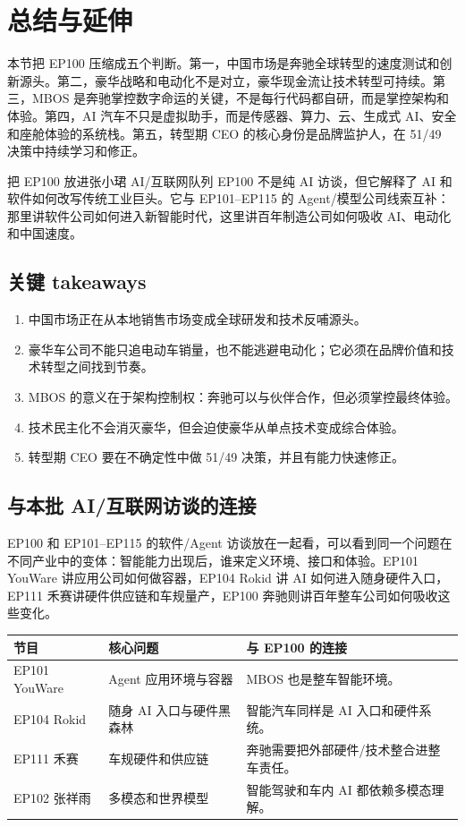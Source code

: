 \section{总结与延伸}

本节把 EP100 压缩成五个判断。第一，中国市场是奔驰全球转型的速度测试和创新源头。第二，豪华战略和电动化不是对立，豪华现金流让技术转型可持续。第三，MBOS 是奔驰掌控数字命运的关键，不是每行代码都自研，而是掌控架构和体验。第四，AI 汽车不只是虚拟助手，而是传感器、算力、云、生成式 AI、安全和座舱体验的系统栈。第五，转型期 CEO 的核心身份是品牌监护人，在 51/49 决策中持续学习和修正。

\begin{importantbox}{把 EP100 放进张小珺 AI/互联网队列}
EP100 不是纯 AI 访谈，但它解释了 AI 和软件如何改写传统工业巨头。它与 EP101--EP115 的 Agent/模型公司线索互补：那里讲软件公司如何进入新智能时代，这里讲百年制造公司如何吸收 AI、电动化和中国速度。
\end{importantbox}

\subsection{关键 takeaways}

\begin{enumerate}
\item 中国市场正在从本地销售市场变成全球研发和技术反哺源头。
\item 豪华车公司不能只追电动车销量，也不能逃避电动化；它必须在品牌价值和技术转型之间找到节奏。
\item MBOS 的意义在于架构控制权：奔驰可以与伙伴合作，但必须掌控最终体验。
\item 技术民主化不会消灭豪华，但会迫使豪华从单点技术变成综合体验。
\item 转型期 CEO 要在不确定性中做 51/49 决策，并且有能力快速修正。
\end{enumerate}

\subsection{与本批 AI/互联网访谈的连接}

EP100 和 EP101--EP115 的软件/Agent 访谈放在一起看，可以看到同一个问题在不同产业中的变体：智能能力出现后，谁来定义环境、接口和体验。EP101 YouWare 讲应用公司如何做容器，EP104 Rokid 讲 AI 如何进入随身硬件入口，EP111 禾赛讲硬件供应链和车规量产，EP100 奔驰则讲百年整车公司如何吸收这些变化。

\noindent\begin{tabularx}{\textwidth}{p{}p{}X}
\toprule
节目 & 核心问题 & 与 EP100 的连接 \\
\midrule
EP101 YouWare & Agent 应用环境与容器 & MBOS 也是整车智能环境。 \\
EP104 Rokid & 随身 AI 入口与硬件黑森林 & 智能汽车同样是 AI 入口和硬件系统。 \\
EP111 禾赛 & 车规硬件和供应链 & 奔驰需要把外部硬件/技术整合进整车责任。 \\
EP102 张祥雨 & 多模态和世界模型 & 智能驾驶和车内 AI 都依赖多模态理解。 \\
\bottomrule
\end{tabularx}

